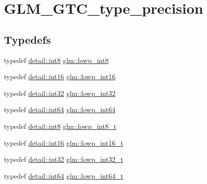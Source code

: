 \hypertarget{group__gtc__type__precision}{}\section{G\+L\+M\+\_\+\+G\+T\+C\+\_\+type\+\_\+precision}
\label{group__gtc__type__precision}
\subsection*{Typedefs}
\begin{DoxyCompactItemize}
\item 
typedef \mbox{\hyperlink{namespaceglm_1_1detail_a04b526a8d7a9b455602a0afa78c531e0}{detail\+::int8}} \mbox{\hyperlink{group__gtc__type__precision_gaf9e675b6392764242ae87eb179e9d3d6}{glm\+::lowp\+\_\+int8}}
\item 
typedef \mbox{\hyperlink{namespaceglm_1_1detail_a375938874ca4f0a0982ec6373b56117b}{detail\+::int16}} \mbox{\hyperlink{group__gtc__type__precision_ga71fc0c399fa4780507748b643733f153}{glm\+::lowp\+\_\+int16}}
\item 
typedef \mbox{\hyperlink{namespaceglm_1_1detail_a9f85b4efeca416cdcec2fd08939a2e17}{detail\+::int32}} \mbox{\hyperlink{group__gtc__type__precision_gad9939c9d6fec1c6accc02a83c6500f08}{glm\+::lowp\+\_\+int32}}
\item 
typedef \mbox{\hyperlink{namespaceglm_1_1detail_a5b1c3227ec636c24a0676746381adfc8}{detail\+::int64}} \mbox{\hyperlink{group__gtc__type__precision_gab8a8e75af347592406e41b3ae2c0712b}{glm\+::lowp\+\_\+int64}}
\item 
typedef \mbox{\hyperlink{namespaceglm_1_1detail_a04b526a8d7a9b455602a0afa78c531e0}{detail\+::int8}} \mbox{\hyperlink{group__gtc__type__precision_gae6092311f6970a305c2df19a372360a3}{glm\+::lowp\+\_\+int8\+\_\+t}}
\item 
typedef \mbox{\hyperlink{namespaceglm_1_1detail_a375938874ca4f0a0982ec6373b56117b}{detail\+::int16}} \mbox{\hyperlink{group__gtc__type__precision_gae34c3d53c4c1434fc9f26538b0185667}{glm\+::lowp\+\_\+int16\+\_\+t}}
\item 
typedef \mbox{\hyperlink{namespaceglm_1_1detail_a9f85b4efeca416cdcec2fd08939a2e17}{detail\+::int32}} \mbox{\hyperlink{group__gtc__type__precision_gad9567c806dc39f534174eef42663119d}{glm\+::lowp\+\_\+int32\+\_\+t}}
\item 
typedef \mbox{\hyperlink{namespaceglm_1_1detail_a5b1c3227ec636c24a0676746381adfc8}{detail\+::int64}} \mbox{\hyperlink{group__gtc__type__precision_ga14d72e76d57c7f28eca8e933816c9fd6}{glm\+::lowp\+\_\+int64\+\_\+t}}

\end{DoxyCompactItemize}
